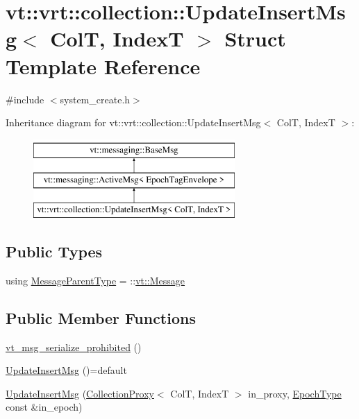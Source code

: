\hypertarget{structvt_1_1vrt_1_1collection_1_1_update_insert_msg}{}\section{vt\+:\+:vrt\+:\+:collection\+:\+:Update\+Insert\+Msg$<$ ColT, IndexT $>$ Struct Template Reference}
\label{structvt_1_1vrt_1_1collection_1_1_update_insert_msg}


{\ttfamily \#include $<$system\+\_\+create.\+h$>$}

Inheritance diagram for vt\+:\+:vrt\+:\+:collection\+:\+:Update\+Insert\+Msg$<$ ColT, IndexT $>$\+:\begin{figure}[H]
\begin{center}
\leavevmode
\includegraphics[height=3.000000cm]{structvt_1_1vrt_1_1collection_1_1_update_insert_msg}
\end{center}
\end{figure}
\subsection*{Public Types}
\begin{DoxyCompactItemize}
\item 
using \hyperlink{structvt_1_1vrt_1_1collection_1_1_update_insert_msg_a974021fa221366babeddb02831c8e89e}{Message\+Parent\+Type} = \+::\hyperlink{namespacevt_a3a3ddfef40b4c90915fa43cdd5f129ea}{vt\+::\+Message}
\end{DoxyCompactItemize}
\subsection*{Public Member Functions}
\begin{DoxyCompactItemize}
\item 
\hyperlink{structvt_1_1vrt_1_1collection_1_1_update_insert_msg_af1ecb3c994e2ef8e5e09a2cfbb0559b6}{vt\+\_\+msg\+\_\+serialize\+\_\+prohibited} ()
\item 
\hyperlink{structvt_1_1vrt_1_1collection_1_1_update_insert_msg_aae10dc2f0e158e40397336160f5dad64}{Update\+Insert\+Msg} ()=default
\item 
\hyperlink{structvt_1_1vrt_1_1collection_1_1_update_insert_msg_a379f7f91b839a1e691de20ac789f010e}{Update\+Insert\+Msg} (\hyperlink{structvt_1_1vrt_1_1collection_1_1_collection_proxy}{Collection\+Proxy}$<$ ColT, IndexT $>$ in\+\_\+proxy, \hyperlink{namespacevt_a985a5adf291c34a3ca263b3378388236}{Epoch\+Type} const \&in\+\_\+epoch)
\end{DoxyCompactItemize}
